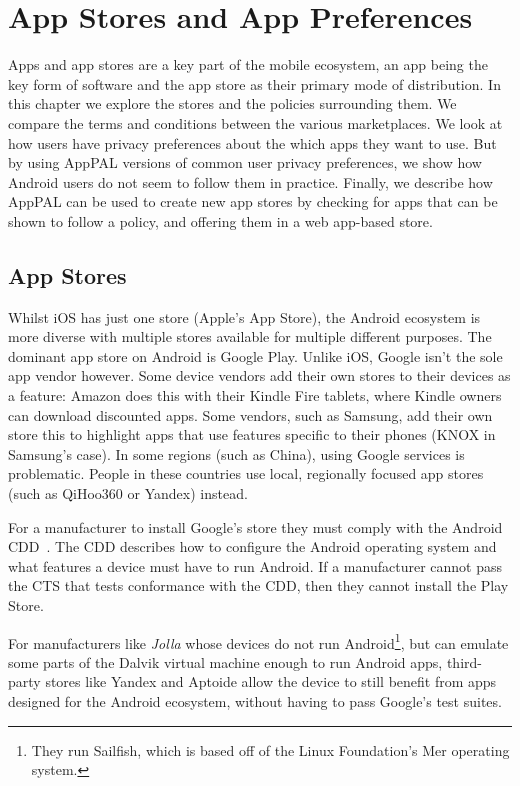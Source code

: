 \documentclass[thesis.tex]{subfiles}
\begin{document}
\chapter{App Stores and App Preferences}
\label{chap:apps-and-stores}

Apps and app stores are a key part of the mobile ecosystem, an app
being the key form of software and the app store as their primary mode
of distribution. In this chapter we explore the stores and the
policies surrounding them. We compare the terms and conditions between
the various marketplaces. We look at how users have privacy
preferences about the which apps they want to use. But by using AppPAL
versions of common user privacy preferences, we show how Android users
do not seem to follow them in practice. Finally, we describe how
AppPAL can be used to create new app stores by checking for apps that
can be shown to follow a policy, and offering them in a web app-based
store.

\section{App Stores}

Whilst iOS has just one store (Apple's App Store), the Android
ecosystem is more diverse with multiple stores available for multiple
different purposes. The dominant app store on Android is Google
Play. Unlike iOS, Google isn't the sole app vendor however. Some
device vendors add their own stores to their devices as a feature:
Amazon does this with their Kindle Fire tablets, where Kindle owners
can download discounted apps. Some vendors, such as Samsung, add their
own store this to highlight apps that use features specific to their
phones (KNOX in Samsung's case). In some regions (such as China),
using Google services is problematic. People in these countries use
local, regionally focused app stores (such as QiHoo360 or Yandex)
instead.

For a manufacturer to install Google's store they must comply with the Android
\ac{CDD}~\cite{google_android_2016}. The \ac{CDD} describes how to configure the
Android operating system and what features a device must have to run Android. If
a manufacturer cannot pass the \ac{CTS} that tests conformance with the \ac{CDD},
then they cannot install the Play Store.

For manufacturers like \emph{Jolla} whose devices do not run
Android\footnote{They run Sailfish, which is based off of the Linux Foundation's
Mer operating system.}, but can emulate some parts of the Dalvik virtual machine
enough to run Android apps, third-party stores like Yandex and Aptoide allow the
device to still benefit from apps designed for the Android ecosystem, without having to pass Google's test suites.
\end{document}

